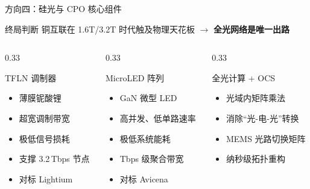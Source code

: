 \documentclass[aspectratio=169, 10pt, UTF8]{ctexbeamer}
\begin{document}
\begin{frame}{方向四：硅光与 CPO 核心组件}
  \begin{block}{终局判断}
    铜互联在 1.6T/3.2T 时代触及物理天花板 $\to$ \textbf{全光网络是唯一出路}
  \end{block}

  \begin{columns}[T]
    \begin{column}{0.33\textwidth}
      \begin{alertblock}{TFLN 调制器}
        \begin{itemize}
          \item 薄膜铌酸锂
          \item 超宽调制带宽
          \item 极低信号损耗
          \item 支撑 3.2\,Tbps 节点
          \item 对标 Lightium
        \end{itemize}
      \end{alertblock}
    \end{column}
    \begin{column}{0.33\textwidth}
      \begin{exampleblock}{MicroLED 阵列}
        \begin{itemize}
          \item GaN 微型 LED
          \item 高并发、低单路速率
          \item 极低系统能耗
          \item Tbps 级聚合带宽
          \item 对标 Avicena
        \end{itemize}
      \end{exampleblock}
    \end{column}
    \begin{column}{0.33\textwidth}
      \begin{block}{全光计算 + OCS}
        \begin{itemize}
          \item 光域内矩阵乘法
          \item 消除``光-电-光''转换
          \item MEMS 光路切换矩阵
          \item 纳秒级拓扑重构
        \end{itemize}
      \end{block}
    \end{column}
  \end{columns}
\end{frame}
\end{document}
